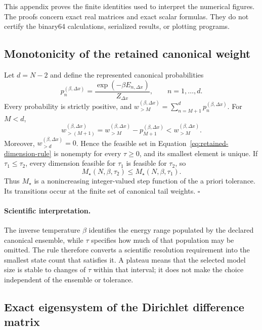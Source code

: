 \documentclass[11pt]{article}
\begin{document}
This appendix proves the finite identities used to interpret the numerical figures.
The proofs concern exact real matrices and exact scalar formulas. They do not certify
the binary64 calculations, serialized results, or plotting programs.

\subsection{Monotonicity of the retained canonical weight}

Let $d=N-2$ and define the represented canonical probabilities
\begin{equation}
 p_n^{(\beta,\Delta x)}
 =\frac{\exp(-\beta E_{n,\Delta x})}{Z_{\Delta x}},
 \qquad n=1,\ldots,d.
\end{equation}
Every probability is strictly positive, and
$w_{>M}^{(\beta,\Delta x)}=\sum_{n=M+1}^{d}p_n^{(\beta,\Delta x)}$.
For $M<d$,
\begin{equation}
 w_{>(M+1)}^{(\beta,\Delta x)}
 =w_{>M}^{(\beta,\Delta x)}-p_{M+1}^{(\beta,\Delta x)}
 <w_{>M}^{(\beta,\Delta x)}.
 \label{eq:appendix-tail-recurrence}
\end{equation}
Moreover, $w_{>d}^{(\beta,\Delta x)}=0$. Hence the feasible set in
Equation~\eqref{eq:retained-dimension-rule} is nonempty for every $\tau\geq0$, and its
smallest element is unique. If $\tau_1\leq\tau_2$, every dimension feasible for
$\tau_1$ is feasible for $\tau_2$, so
\begin{equation}
 M_{\star}(N,\beta,\tau_2)
 \leq M_{\star}(N,\beta,\tau_1).
\end{equation}
Thus $M_{\star}$ is a nonincreasing integer-valued step function of the a priori
tolerance. Its transitions occur at the finite set of canonical tail weights.
\hfill$\square$

\paragraph{Scientific interpretation.}
The inverse temperature $\beta$ identifies the energy range populated by the declared
canonical ensemble, while $\tau$ specifies how much of that population may be omitted.
The rule therefore converts a scientific resolution requirement into the smallest
state count that satisfies it. A plateau means that the selected model size is stable
to changes of $\tau$ within that interval; it does not make the choice independent of
the ensemble or tolerance.

\subsection{Exact eigensystem of the Dirichlet difference matrix}
\end{document}
